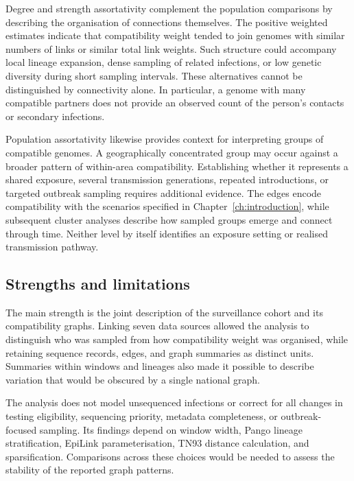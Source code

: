 Degree and strength assortativity complement the population comparisons by describing the organisation of connections themselves. The positive weighted estimates indicate that compatibility weight tended to join genomes with similar numbers of links or similar total link weights. Such structure could accompany local lineage expansion, dense sampling of related infections, or low genetic diversity during short sampling intervals. These alternatives cannot be distinguished by connectivity alone. In particular, a genome with many compatible partners does not provide an observed count of the person's contacts or secondary infections.

Population assortativity likewise provides context for interpreting groups of compatible genomes. A geographically concentrated group may occur against a broader pattern of within-area compatibility. Establishing whether it represents a shared exposure, several transmission generations, repeated introductions, or targeted outbreak sampling requires additional evidence. The edges encode compatibility with the scenarios specified in Chapter~\ref{ch:introduction}, while subsequent cluster analyses describe how sampled groups emerge and connect through time. Neither level by itself identifies an exposure setting or realised transmission pathway.

\subsection{Strengths and limitations}\label{sec:ch4_discussion_strengths_limitations}

The main strength is the joint description of the surveillance cohort and its compatibility graphs. Linking seven data sources allowed the analysis to distinguish who was sampled from how compatibility weight was organised, while retaining sequence records, edges, and graph summaries as distinct units. Summaries within windows and lineages also made it possible to describe variation that would be obscured by a single national graph.

The analysis does not model unsequenced infections or correct for all changes in testing eligibility, sequencing priority, metadata completeness, or outbreak-focused sampling. Its findings depend on window width, Pango lineage stratification, EpiLink parameterisation, TN93 distance calculation, and sparsification. Comparisons across these choices would be needed to assess the stability of the reported graph patterns.

